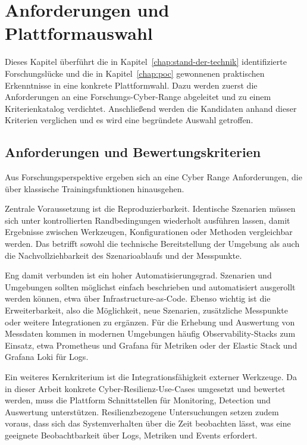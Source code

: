 \chapter{Anforderungen und Plattformauswahl}
\label{chap:auswahl}

Dieses Kapitel überführt die in Kapitel~\ref{chap:stand-der-technik} identifizierte Forschungslücke
und die in Kapitel~\ref{chap:poc} gewonnenen praktischen Erkenntnisse in eine konkrete
Plattformwahl. Dazu werden zuerst die Anforderungen an eine Forschungs-Cyber-Range abgeleitet und zu
einem Kriterienkatalog verdichtet. Anschließend werden die Kandidaten anhand dieser Kriterien
verglichen und es wird eine begründete Auswahl getroffen.

\section{Anforderungen und Bewertungskriterien}
\label{sec:anforderungen-kriterien}

Aus Forschungsperspektive ergeben sich an eine Cyber Range Anforderungen, die über klassische
Trainingsfunktionen hinausgehen.

Zentrale Voraussetzung ist die Reproduzierbarkeit. Identische Szenarien müssen sich unter
kontrollierten Randbedingungen wiederholt ausführen lassen, damit Ergebnisse zwischen Werkzeugen,
Konfigurationen oder Methoden vergleichbar werden. Das betrifft sowohl die technische Bereitstellung
der Umgebung als auch die Nachvollziehbarkeit des Szenarioablaufs und der Messpunkte.

Eng damit verbunden ist ein hoher Automatisierungsgrad. Szenarien und Umgebungen sollten möglichst
einfach beschrieben und automatisiert ausgerollt werden können, etwa über Infrastructure-as-Code.
Ebenso wichtig ist die Erweiterbarkeit, also die Möglichkeit, neue Szenarien, zusätzliche Messpunkte
oder weitere Integrationen zu ergänzen. Für die Erhebung und Auswertung von Messdaten kommen in
modernen Umgebungen häufig Observability-Stacks zum Einsatz, etwa Prometheus und Grafana für
Metriken oder der Elastic Stack und Grafana Loki für Logs.

Ein weiteres Kernkriterium ist die Integrationsfähigkeit externer Werkzeuge. Da in dieser Arbeit
konkrete Cyber-Resilienz-Use-Cases umgesetzt und bewertet werden, muss die Plattform Schnittstellen
für Monitoring, Detection und Auswertung unterstützen. Resilienzbezogene Untersuchungen setzen zudem
voraus, dass sich das Systemverhalten über die Zeit beobachten lässt, was eine geeignete
Beobachtbarkeit über Logs, Metriken und Events erfordert.


